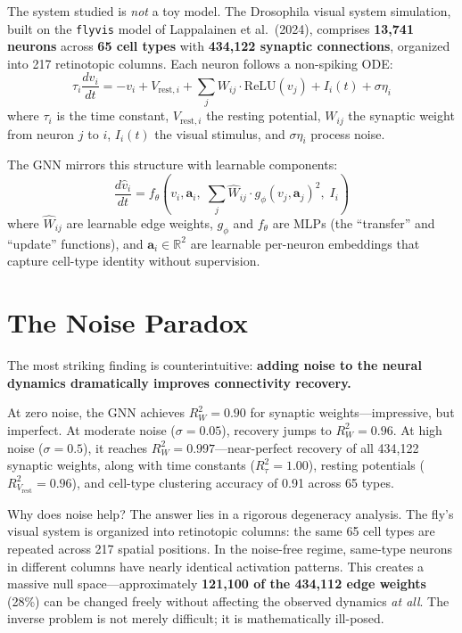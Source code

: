 \documentclass[11pt,twocolumn]{article}
\begin{document}
The system studied is \emph{not} a toy model. The Drosophila visual system simulation, built on the \texttt{flyvis} model of Lappalainen et al.\ (2024), comprises \textbf{13,741 neurons} across \textbf{65 cell types} with \textbf{434,122 synaptic connections}, organized into 217 retinotopic columns. Each neuron follows a non-spiking ODE:
\begin{equation}
\tau_i \frac{dv_i}{dt} = -v_i + V_{\text{rest},i} + \sum_j W_{ij} \cdot \text{ReLU}(v_j) + I_i(t) + \sigma\eta_i
\label{eq:ode}
\end{equation}
where $\tau_i$ is the time constant, $V_{\text{rest},i}$ the resting potential, $W_{ij}$ the synaptic weight from neuron $j$ to $i$, $I_i(t)$ the visual stimulus, and $\sigma\eta_i$ process noise.

The GNN mirrors this structure with learnable components:
\begin{equation}
\frac{d\hat{v}_i}{dt} = f_\theta\!\left(v_i, \mathbf{a}_i,\; \sum_j \hat{W}_{ij} \cdot g_\phi(v_j, \mathbf{a}_j)^2,\; I_i\right)
\end{equation}
where $\hat{W}_{ij}$ are learnable edge weights, $g_\phi$ and $f_\theta$ are MLPs (the ``transfer'' and ``update'' functions), and $\mathbf{a}_i \in \mathbb{R}^2$ are learnable per-neuron embeddings that capture cell-type identity without supervision.

\section{The Noise Paradox}

The most striking finding is counterintuitive: \textbf{adding noise to the neural dynamics dramatically improves connectivity recovery.}

At zero noise, the GNN achieves $R^2_W = 0.90$ for synaptic weights---impressive, but imperfect. At moderate noise ($\sigma = 0.05$), recovery jumps to $R^2_W = 0.96$. At high noise ($\sigma = 0.5$), it reaches $R^2_W = 0.997$---near-perfect recovery of all 434,122 synaptic weights, along with time constants ($R^2_\tau = 1.00$), resting potentials ($R^2_{V_\text{rest}} = 0.96$), and cell-type clustering accuracy of 0.91 across 65 types.

Why does noise help? The answer lies in a rigorous degeneracy analysis. The fly's visual system is organized into retinotopic columns: the same 65 cell types are repeated across 217 spatial positions. In the noise-free regime, same-type neurons in different columns have nearly identical activation patterns. This creates a massive null space---approximately \textbf{121,100 of the 434,112 edge weights} (28\%) can be changed freely without affecting the observed dynamics \emph{at all}. The inverse problem is not merely difficult; it is mathematically ill-posed.
\end{document}

